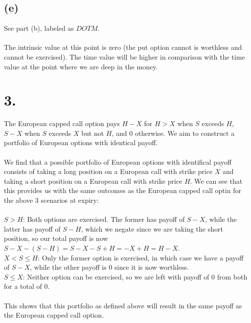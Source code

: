 \documentclass{article}
\begin{document}
{\subsection*{(e)}

See part (b), labeled as $DOTM$. \\ \\
The intrinsic value at this point is zero (the put option cannot is worthless and cannot be exercised). 
The time value will be higher in comparison with the time value at the point where we are deep in the money. 

}

\section*{3.}
{\Large 

The European capped call option pays $H - X$ for $H > X$ when $S$ exceeds $H$, $S - X$ when $S$ exceeds $X$ but not $H$, and 0 otherwise. We aim to construct a portfolio of European options with identical payoff. \\ \\
We find that a possible portfolio of European options with identifical payoff consists of taking a long position on a European call with strike price $X$ and taking a short position on a European call with strike price $H$. We can see that this provides us with the same outcomes as the European capped call optin for the above 3 scenarios at expiry: \\ \\ 
$S > H$: Both options are exercised. The former has payoff of $S - X$, while the latter has payoff of $S - H$, which we negate since we are taking the short position, so our total payoff is now $S - X - (S - H) = S - X - S + H = -X + H = H - X$. \\
$X < S \leq H$: Only the former option is exercised, in which case we have a payoff of $S - X$, while the other payoff is 0 since it is now worthless. \\
$S \leq X$: Neither option can be exercised, so we are left with payoff of 0 from both for a total of 0. \\ \\
This shows that this portfolio as defined above will result in the same payoff as the European capped call option.

}
\end{document}
